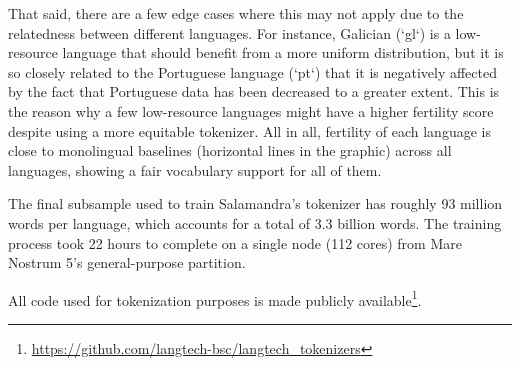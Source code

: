 That said, there are a few edge cases where this may not apply due to the relatedness between different languages. For instance, Galician (`gl`) is a low-resource language that should benefit from a more uniform distribution, but it is so closely related to the Portuguese language (`pt`) that it is negatively affected by the fact that Portuguese data has been decreased to a greater extent. This is the reason why a few low-resource languages might have a higher fertility score despite using a more equitable tokenizer. All in all, fertility of each language is close to monolingual baselines (horizontal lines in the graphic) across all languages, showing a fair vocabulary support for all of them.



The final subsample used to train Salamandra's tokenizer has roughly 93 million words per language, which accounts for a total of 3.3 billion words. The training process took 22 hours to complete on a single node (112 cores) from Mare Nostrum 5's general-purpose partition.

All code used for tokenization purposes is made publicly available\footnote{\url{https://github.com/langtech-bsc/langtech_tokenizers}}.





